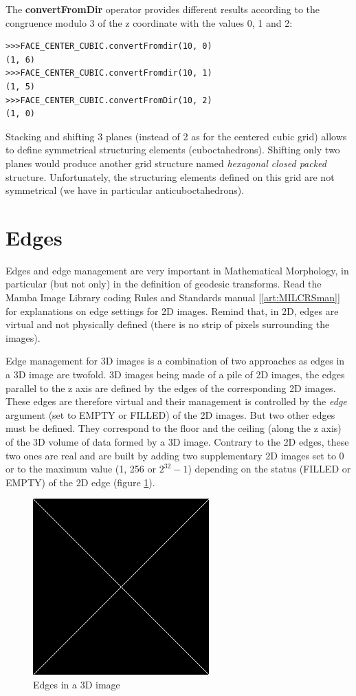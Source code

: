 \documentclass[a4paper,10pt,oneside]{article}
\begin{document}
The \textbf{convertFromDir} operator provides different results according to the congruence modulo 3 of the z coordinate with the values
0, 1 and 2:

\lstset{language=Python}
\begin{lstlisting}
>>>FACE_CENTER_CUBIC.convertFromdir(10, 0)
(1, 6)
>>>FACE_CENTER_CUBIC.convertFromdir(10, 1)
(1, 5)
>>>FACE_CENTER_CUBIC.convertFromDir(10, 2)
(1, 0)
\end{lstlisting}

Stacking and shifting 3 planes (instead of 2 as for the centered cubic grid) allows to define symmetrical structuring elements (cuboctahedrons).
Shifting only two planes would produce another grid structure named \textit{hexagonal closed packed} structure. Unfortunately, the structuring
elements defined on this grid are not symmetrical (we have in particular anticuboctahedrons).

\section{Edges}
Edges and edge management are very important in Mathematical Morphology, in particular (but not only) in  the definition of geodesic transforms.
Read the Mamba Image Library coding Rules and Standards manual [\ref{art:MILCRSman}] for explanations on edge settings for 2D images. Remind that,
in 2D, edges are virtual and not physically defined (there is no strip of pixels surrounding the images).

Edge management for 3D images is a combination of two approaches as edges in a 3D image are twofold. 3D images being made of a pile of 2D
images, the edges parallel to the z axis are defined by the edges of the corresponding 2D images. These edges are therefore virtual and their management
is controlled by the \textit{edge} argument (set to EMPTY or FILLED) of the 2D images. But two other edges must be defined. They correspond
to the floor and the ceiling (along the z axis) of the 3D volume of data formed by a 3D image. Contrary to the 2D edges, these two ones are
real and are built by adding two supplementary 2D images set to 0 or to the maximum value (1, 256 or $2^{32} - 1$) depending on the status (FILLED or EMPTY)
of the 2D edge (figure \ref{fig:3D_edges}).

\begin{figure}
\centering
\includegraphics[scale=0.3]{figures/xxx.png}
\caption{Edges in a 3D image}
\label{fig:3D_edges}
\end{figure}
\end{document}
